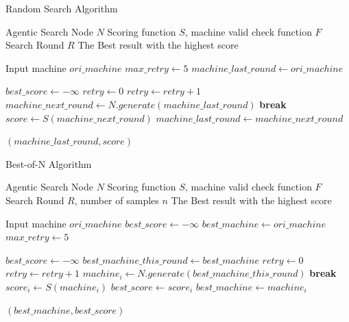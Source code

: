 \begin{algorithm}
\caption{Random Search Algorithm}
\label{alg:random-search}
\begin{algorithmic}[1]
\Require Agentic Search Node $N$
\Require Scoring function $S$, machine valid check function $F$
\Require Search Round $R$
\Ensure The Best result with the highest score

\State Input machine $ori\_machine$
\State $max\_retry \gets 5$
\State $machine\_last\_round \gets ori\_machine$

    \State $best\_score \gets -\infty$
    \State $retry \gets 0$
        \State $retry \gets retry + 1$
        \State $machine\_next\_round \gets N.generate(machine\_last\_round)$
            \State \textbf{break} 
        \EndIf
    \EndWhile
    \State $score \gets S(machine\_next\_round)$
    \State $machine\_last\_round \gets machine\_next\_round$
\EndFor

\State \Return $(machine\_last\_round, score)$
\end{algorithmic}
\end{algorithm}


\begin{algorithm}
\caption{Best-of-N Algorithm}
\label{alg:bestofn}
\begin{algorithmic}[1]
\Require Agentic Search Node $N$
\Require Scoring function $S$, machine valid check function $F$
\Require Search Round $R$, number of samples $n$
\Ensure The Best result with the highest score

\State Input machine $ori\_machine$
\State $best\_score \gets -\infty$
\State $best\_machine \gets ori\_machine$
\State $max\_retry \gets 5$

    \State $best\_score \gets -\infty$
    \State $best\_machine\_this\_round \gets best\_machine$
        \State $retry \gets 0$
            \State $retry \gets retry + 1$
            \State $machine_i \gets N.generate(best\_machine\_this\_round)$
                \State \textbf{break} 
            \EndIf
        \EndWhile
        \State $score_i \gets S(machine_i)$
            \State $best\_score \gets score_i$
            \State $best\_machine \gets machine_i$
        \EndIf
    \EndFor
\EndFor

\State \Return $(best\_machine, best\_score)$
\end{algorithmic}
\end{algorithm}


